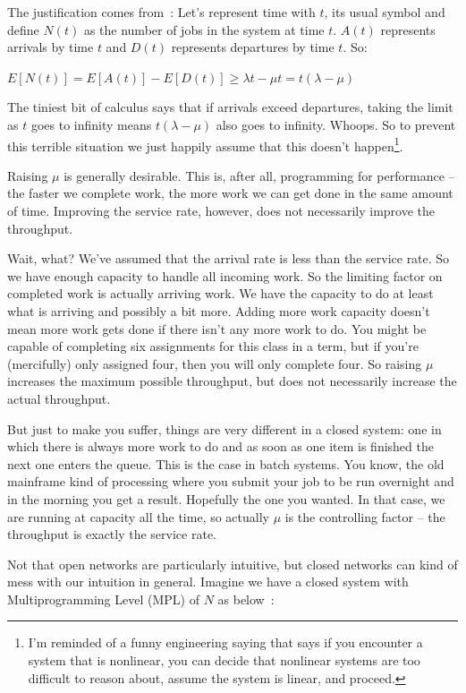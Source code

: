 The justification comes from~\cite{pmd}: Let's represent time with $t$, its usual symbol and define $N(t)$ as the number of jobs in the system at time $t$. $A(t)$ represents arrivals by time $t$ and $D(t)$ represents departures by time $t$. So:

\begin{center}
	$E[N(t)] = E[A(t)] - E[D(t)] \geq \lambda t - \mu t = t (\lambda - \mu) $
\end{center}

The tiniest bit of calculus says that if arrivals exceed departures, taking the limit as $t$ goes to infinity means $t (\lambda - \mu) $ also goes to infinity. Whoops. So to prevent this terrible situation we just happily assume that this doesn't happen\footnote{I'm reminded of a funny engineering saying that says if you encounter a system that is nonlinear, you can decide that nonlinear systems are too difficult to reason about, assume the system is linear, and proceed.}. 

Raising $\mu$ is generally desirable. This is, after all, programming for performance -- the faster we complete work, the more work we can get done in the same amount of time. Improving the service rate, however, does not necessarily improve the throughput. 

Wait, what? We've assumed that the arrival rate is less than the service rate. So we have enough capacity to handle all incoming work. So the limiting factor on completed work is actually arriving work. We have the capacity to do at least what is arriving and possibly a bit more. Adding more work capacity doesn't mean more work gets done if there isn't any more work to do. You might be capable of completing six assignments for this class in a term, but if you're (mercifully) only assigned four, then you will only complete four. So raising $\mu$ increases the maximum possible throughput, but does not necessarily increase the actual throughput.

But just to make you suffer, things are very different in a closed system: one in which there is always more work to do and as soon as one item is finished the next one enters the queue. This is the case in batch systems. You know, the old mainframe kind of processing where you submit your job to be run overnight and in the morning you get a result. Hopefully the one you wanted. In that case, we are running at capacity all the time, so actually $\mu$ is the controlling factor -- the throughput is exactly the service rate. 

Not that open networks are particularly intuitive, but closed networks can kind of mess with our intuition in general. Imagine we have a closed system with Multiprogramming Level (MPL) of $N$ as below~\cite{pmd}:

